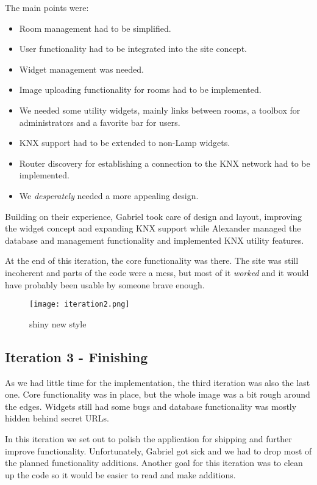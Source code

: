   The main points were:
  \begin{itemize}
    \item Room management had to be simplified.
    \item User functionality had to be integrated into the site concept.
    \item Widget management was needed.
    \item Image uploading functionality for rooms had to be implemented.
    \item We needed some utility widgets, mainly links between rooms, a toolbox for administrators and a favorite bar for users.
    \item KNX support had to be extended to non-Lamp widgets.
    \item Router discovery for establishing a connection to the KNX network had to be implemented.
    \item We \emph{desperately} needed a more appealing design.
  \end{itemize}

  Building on their experience, Gabriel took care of design and layout, improving the widget concept and expanding KNX support while Alexander managed the database and management functionality and implemented KNX utility features.

  At the end of this iteration, the core functionality was there. The site was still incoherent and parts of the code were a mess, but most of it \emph{worked} and it would have probably been usable by someone brave enough.

  \begin{figure}[h]
  \centering
  \texttt{[image: iteration2.png]}
  \caption{shiny new style}
  \label{fig:iterations2}
  \end{figure}

\clearpage
\subsection{Iteration 3 - Finishing}
  As we had little time for the implementation, the third iteration was also the last one. Core functionality was in place, but the whole image was a bit rough around the edges. Widgets still had some bugs and database functionality was mostly hidden behind secret URLs.

  In this iteration we set out to polish the application for shipping and further improve functionality. Unfortunately, Gabriel got sick and we had to drop most of the planned functionality additions. Another goal for this iteration was to clean up the code so it would be easier to read and make additions.

